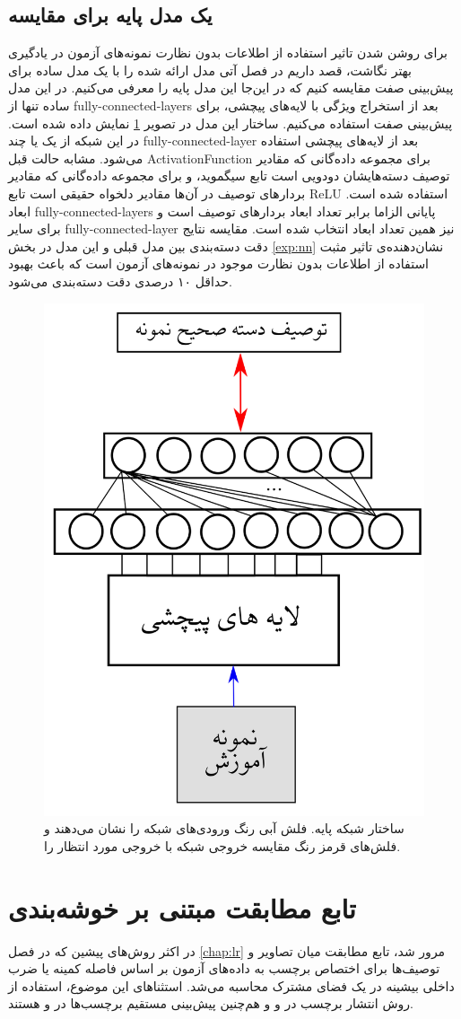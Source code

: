 \subsection{یک مدل پایه برای مقایسه}\label{nn_basic}
برای روشن شدن تاثیر استفاده از اطلاعات بدون نظارت نمونه‌های آزمون در یادگیری بهتر نگاشت، قصد داریم در فصل آتی مدل ارائه شده را با یک مدل ساده برای پیش‌بینی صفت مقایسه کنیم که در این‌جا این مدل پایه را معرفی می‌کنیم. در این مدل ساده تنها  از
\glspl{fully-connected-layer}
بعد از استخراج ویژگی با لایه‌های پیچشی، برای پیش‌بینی صفت استفاده می‌کنیم. ساختار این مدل در تصویر \ref{fig:nn_basic} نمایش داده شده است. در این شبکه از یک یا چند
\gls{fully-connected-layer}
بعد از لایه‌های پیچشی استفاده می‌شود. مشابه حالت قبل \gls{ActivationFunction} برای مجموعه داده‌گانی که مقادیر توصیف دسته‌هایشان دودویی است تابع سیگموید، و برای مجموعه داده‌گانی که مقادیر بردارهای توصیف در آن‌ها مقادیر دلخواه حقیقی است تابع \gls{ReLU} استفاده شده است.
ابعاد  \glspl{fully-connected-layer} پایانی الزاما برابر تعداد ابعاد بردارهای توصیف است و برای سایر   \gls{fully-connected-layer} نیز همین تعداد ابعاد انتخاب شده است.
مقایسه نتایج دقت دسته‌بندی بین مدل قبلی و این مدل در بخش \ref{exp:nn} نشان‌دهنده‌ی تاثیر مثبت استفاده از اطلاعات بدون نظارت موجود در نمونه‌های آزمون است که باعث بهبود حداقل ۱۰ درصدی دقت دسته‌بندی  می‌شود.
\begin{figure}[!ht]
\centering
\includegraphics[width=0.4\linewidth]{images/basic_net}
\caption[شبکه‌ی پایه برای پیش‌بینی صفت]{
ساختار شبکه پایه. فلش آبی رنگ ورودی‌های شبکه را نشان می‌دهند و فلش‌های قرمز رنگ مقایسه خروجی شبکه با خروجی مورد انتظار را.}
\label{fig:nn_basic}
\end{figure}
\section{ تابع مطابقت مبتنی بر خوشه‌بندی }\label{compatibility_function}
در اکثر روش‌های پیشین که در فصل \ref{chap:lr} مرور شد، تابع مطابقت میان تصاویر و توصیف‌ها برای اختصاص برچسب به داده‌های آزمون بر اساس فاصله کمینه یا ضرب داخلی بیشینه در یک فضای مشترک محاسبه می‌شد. استثناهای این موضوع، استفاده از روش انتشار برچسب در \cite{Fu2014} و \cite{Kodirov2015} و هم‌چنین پیش‌بینی مستقیم برچسب‌ها در
\cite{li15max}
و
\cite{semi15}
هستند.

